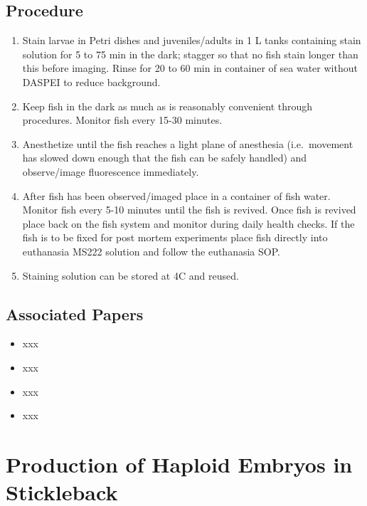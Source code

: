 \documentclass[
  letterpaper,
  DIV=11,
  numbers=noendperiod]{scrreprt}
\providecommand{\tightlist}{%
  \setlength{\itemsep}{0pt}\setlength{\parskip}{0pt}}\usepackage{longtable,booktabs,array}
\begin{document}
\hypertarget{procedure-83}{%
\section{Procedure}\label{procedure-83}}

\begin{enumerate}
\def\labelenumi{\arabic{enumi}.}
\tightlist
\item
  Stain larvae in Petri dishes and juveniles/adults in 1 L tanks
  containing stain solution for 5 to 75 min in the dark; stagger so that
  no fish stain longer than this before imaging. Rinse for 20 to 60 min
  in container of sea water without DASPEI to reduce background.
\item
  Keep fish in the dark as much as is reasonably convenient through
  procedures. Monitor fish every 15-30 minutes.
\item
  Anesthetize until the fish reaches a light plane of anesthesia
  (i.e.~movement has slowed down enough that the fish can be safely
  handled) and observe/image fluorescence immediately.
\item
  After fish has been observed/imaged place in a container of fish
  water. Monitor fish every 5-10 minutes until the fish is revived. Once
  fish is revived place back on the fish system and monitor during daily
  health checks. If the fish is to be fixed for post mortem experiments
  place fish directly into euthanasia MS222 solution and follow the
  euthanasia SOP.
\item
  Staining solution can be stored at 4C and reused.
\end{enumerate}

\hypertarget{associated-papers-57}{%
\section{Associated Papers}\label{associated-papers-57}}

\begin{itemize}
\tightlist
\item
  xxx
\item
  xxx
\item
  xxx
\item
  xxx
\end{itemize}

\hypertarget{sec-vert_exp-haploid_SB}{%
\chapter{Production of Haploid Embryos in
Stickleback}\label{sec-vert_exp-haploid_SB}}
\end{document}
